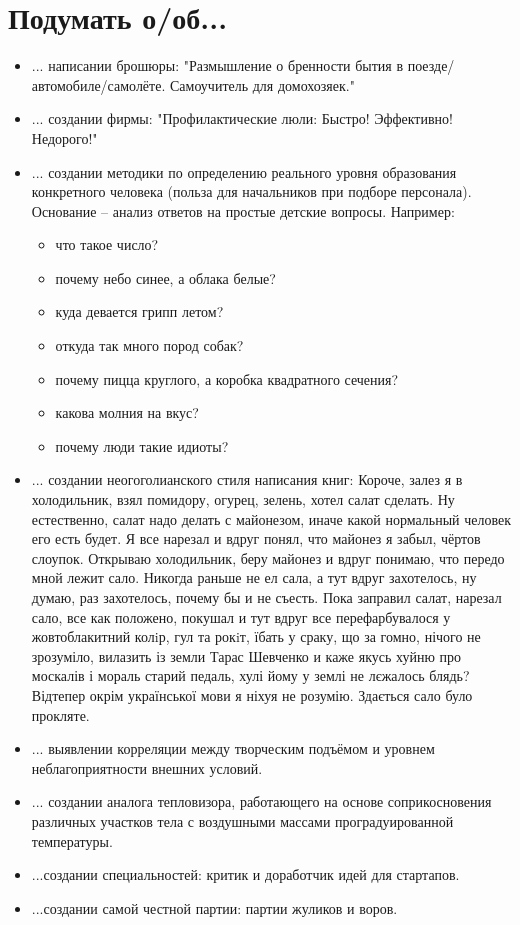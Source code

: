 \section{Подумать о/об...}
\begin{itemize}
\item ... написании брошюры: "Размышление о бренности бытия в поезде/автомобиле/самолёте. Самоучитель для домохозяек."
\item ... создании фирмы: "Профилактические люли: Быстро! Эффективно! Недорого!"
\item ...  создании методики по определению реального уровня образования конкретного человека (польза для начальников при подборе персонала). Основание -- анализ ответов на простые детские вопросы.
Например:
    \begin{itemize}
        \item что такое число?
        \item почему небо синее, а облака белые?
        \item куда девается грипп летом?
        \item откуда так много пород собак?
        \item почему пицца круглого, а коробка квадратного сечения?
        \item какова молния на вкус?
        \item почему люди такие идиоты?
    \end{itemize}
\item ... создании неогоголианского стиля написания книг:
    Короче, залез я в холодильник, взял помидору, огурец, зелень, хотел салат сделать. Ну естественно, салат надо делать с майонезом, иначе
    какой нормальный человек его есть будет. Я все нарезал и вдруг понял, что майонез я забыл, чёртов слоупок. Открываю холодильник, беру
    майонез и вдруг понимаю, что передо мной лежит сало. Никогда раньше не ел сала, а тут вдруг захотелось, ну думаю, раз захотелось, почему
    бы и не съесть. Пока заправил салат, нарезал сало, все как положено, покушал и тут вдруг все перефарбувалося у жовтоблакитний колiр, гул
    та рокiт, їбать у сраку, що за гомно, нічого не зрозуміло, вилазить із земли Тарас Шевченко и каже якусь хуйню про москалів і мораль
    старий педаль, хулі йому у землі не лєжалось блядь? Відтепер окрім української мови я ніхуя не розумію. Здається сало було прокляте.
\item ... выявлении корреляции между творческим подъёмом и уровнем неблагоприятности внешних условий.
\item ... создании аналога тепловизора, работающего на основе соприкосновения различных участков тела с воздушными массами проградуированной температуры.
\item ...создании специальностей: критик и доработчик идей для стартапов.
\item ...создании самой честной партии: партии жуликов и воров.
\end{itemize}
